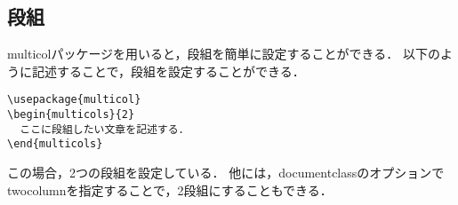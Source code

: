 \subsection{段組}
multicolパッケージを用いると，段組を簡単に設定することができる．
以下のように記述することで，段組を設定することができる．
\begin{lstlisting}
\usepackage{multicol}
\begin{multicols}{2}
  ここに段組したい文章を記述する．
\end{multicols}
\end{lstlisting}
この場合，2つの段組を設定している．
他には，documentclassのオプションでtwocolumnを指定することで，2段組にすることもできる．